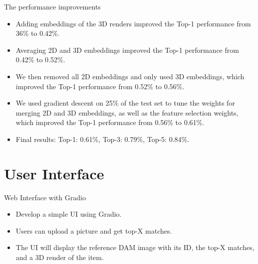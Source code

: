 \documentclass{beamer}
\begin{document}
\begin{frame}{The performance improvements}
    \begin{itemize}
        \item Adding embeddings of the 3D renders improved the Top-1 performance from 36\% to 0.42\%.
        \item Averaging 2D and 3D embeddings improved the Top-1 performance from 0.42\% to 0.52\%.
        \item We then removed all 2D embeddings and only used 3D embeddings, which improved the Top-1 performance from 0.52\% to 0.56\%.
        \item We used gradient descent on 25\% of the test set to tune the weights for merging 2D and 3D embeddings, as well as the feature selection weights, which improved the Top-1 performance from 0.56\% to 0.61\%.
        \item Final results: Top-1: 0.61\%, Top-3: 0.79\%, Top-5: 0.84\%.
    \end{itemize}
\end{frame}

\section{User Interface}
\begin{frame}{Web Interface with Gradio}
\begin{itemize}
    \item Develop a simple UI using Gradio.
    \item Users can upload a picture and get top-X matches.
    \item The UI will display the reference DAM image with its ID, the top-X matches, and a 3D render of the item.
\end{itemize}
\end{frame}
\end{document}

